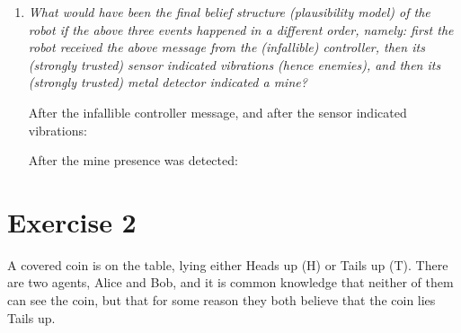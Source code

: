\documentclass[leqno]{article}
\begin{document}
\begin{enumerate}
  \item \textit{What would have been the final belief structure (plausibility
  model) of the robot if the above three events happened in a different order,
  namely: first the robot received the above message from the (infallible)
  controller, then its (strongly trusted) sensor indicated vibrations (hence
  enemies), and then its (strongly trusted) metal detector indicated a mine?}

  After the infallible controller message, and after the sensor indicated
  vibrations:
  \begin{center}
  \end{center}

  After the mine presence was detected:
  \begin{center}
  \end{center}

\end{enumerate}

\section*{Exercise 2}
A covered coin is on the table, lying either Heads up (H) or Tails up (T).
There are two agents, Alice and Bob, and it is common knowledge that neither of
them can see the coin, but that for some reason they both believe that the coin
lies Tails up.
\end{document}
